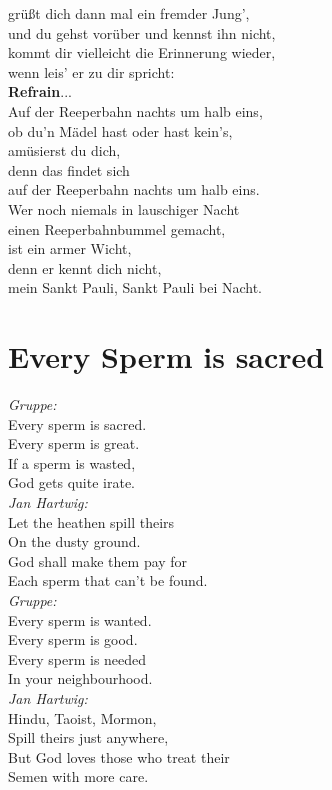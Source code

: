 \documentclass[twoside,8pt]{scrartcl}
\begin{document}
grüßt dich dann mal ein fremder Jung',\\
und du gehst vorüber und kennst ihn nicht,\\
kommt dir vielleicht die Erinnerung wieder,\\
wenn leis' er zu dir spricht:\\
\newline
\textbf{Refrain}...\\
\newline
Auf der Reeperbahn nachts um halb eins,\\
ob du'n Mädel hast oder hast kein's,\\
amüsierst du dich,\\
denn das findet sich\\
auf der Reeperbahn nachts um halb eins.\\
Wer noch niemals in lauschiger Nacht\\
einen Reeperbahnbummel gemacht,\\
ist ein armer Wicht,\\
denn er kennt dich nicht,\\
mein Sankt Pauli, Sankt Pauli bei Nacht.\\
\clearpage
\section{Every Sperm is sacred}
\textit{Gruppe:}\\
Every sperm is sacred.\\
Every sperm is great.\\
If a sperm is wasted,\\
God gets quite irate.\\
\newline
\textit{Jan Hartwig:}\\
Let the heathen spill theirs\\
On the dusty ground.\\
God shall make them pay for\\
Each sperm that can't be found.\\
\newline
\textit{Gruppe:}\\
Every sperm is wanted.\\
Every sperm is good.\\
Every sperm is needed\\
In your neighbourhood.\\
\newline
\textit{Jan Hartwig:}\\
Hindu, Taoist, Mormon,\\
Spill theirs just anywhere,\\
But God loves those who treat their\\
Semen with more care.\\
\clearpage
\end{document}
